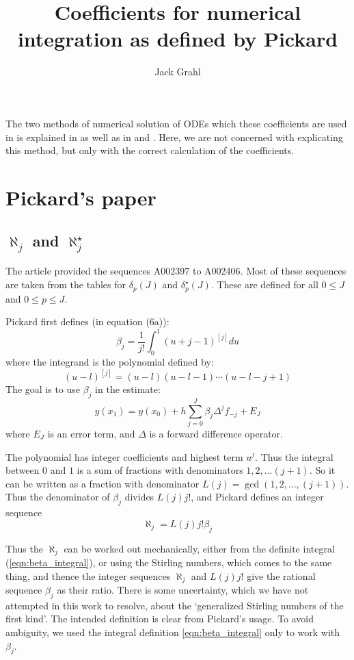 \documentclass{article}
\title{Coefficients for numerical integration as defined by Pickard}
\author{Jack Grahl}
\begin{document}
\maketitle
{}

The two methods of numerical solution of ODEs which these coefficients are used in is explained in \cite{pickard} as well as in \cite{collatz} and \cite{henrici}.
Here, we are not concerned with explicating this method, but only with the correct calculation of the coefficients.
\section{Pickard's paper}
\subsection{$\aleph_j$ and $\aleph^{\star}_j$}
The article \cite{pickard} provided the sequences A002397 to A002406. Most of these sequences are taken from the tables for $\delta_p(J)$ and $\delta^{\star}_p(J)$. These are defined for all $0 \leq J$ and $0 \leq p \leq J$.

Pickard first defines (in equation (6a)):
\begin{equation}\label{eqn:beta_integral}
 \beta_j = \frac{1}{j!}\int_0^1 (u + j - 1)^{[j]} du 
\end{equation}
where the integrand is the polynomial defined by:
\[ (u - l)^{[j]} = (u - l)(u - l - 1)\cdots(u - l - j + 1) \]
The goal is to use $\beta_j$ in the estimate:
\[ y(x_1) = y(x_0) + h\sum_{j=0}^{J} \beta_j \Delta^{j}f_{-j} + E_{J} \]
where $E_J$ is an error term, and $\Delta$ is a forward difference operator.

The polynomial has integer coefficients and highest term $u^{j}$.
Thus the integral between $0$ and $1$ is a sum of fractions with denominators $1, 2, \ldots (j+1)$.
So it can be written as a fraction with denominator $L(j) = \gcd(1, 2, \ldots, (j+1))$.
Thus the denominator of $\beta_j$ divides $L(j)j!$, and Pickard defines an integer sequence
\begin{equation}\label{eqn:aleph}
 \aleph_j = L(j)j!\beta_j 
\end{equation}

Thus the $\aleph_j$ can be worked out mechanically, either from the definite integral (\ref{eqn:beta_integral}), or using the Stirling numbers, which comes to the same thing, and thence the integer sequences $\aleph_j$ and $L(j)j!$ give the rational sequence $\beta_j$ as their ratio.
There is some uncertainty, which we have not attempted in this work to resolve, about the `generalized Stirling numbers of the first kind'. The intended definition is clear from Pickard's usage. To avoid ambiguity, we used the integral definition \ref{eqn:beta_integral} only to work with $\beta_j$.
\end{document}
